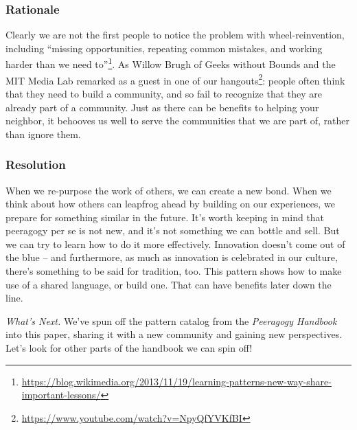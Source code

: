 \subsubsection*{Rationale} 
Clearly we are not the first people to notice the problem with wheel-reinvention, including ``missing opportunities, repeating common mistakes, and working harder than we need to''\footnote{\url{https://blog.wikimedia.org/2013/11/19/learning-patterns-new-way-share-important-lessons/}}.  As Willow Brugh of Geeks without Bounds and the MIT Media Lab remarked as a guest in one of our hangouts\footnote{\url{https://www.youtube.com/watch?v=NpyQfYVKfBI}}: people often think that they need to build a community, and so fail to recognize that they are already part of a community.  Just as there can be benefits to helping your neighbor, it behooves us well to serve the communities that we are part of, rather than ignore them.  

\subsubsection*{Resolution} When we re-purpose the work of others, we can create a new bond.   When we think about how others can leapfrog ahead by building on our experiences, we prepare for something similar in the future.  It's worth keeping in mind that peeragogy per se is not new, and it's not something we can bottle and sell.  But we can try to learn how to do it more effectively.  Innovation doesn't come out of the blue -- and furthermore, as much as innovation is celebrated in our culture, there's something to be said for tradition, too.   This pattern shows how to make use of a shared language, or build one.  That can have benefits later down the line.

\begin{framed}
\emph{What's Next.}
We've spun off the pattern catalog from the \emph{Peeragogy Handbook} into this paper, sharing it with a new community and gaining new perspectives.  Let's look for other parts of the handbook we can spin off!
\end{framed}

\endgroup
    
    
    
    
    
    
    
    
    
    
    